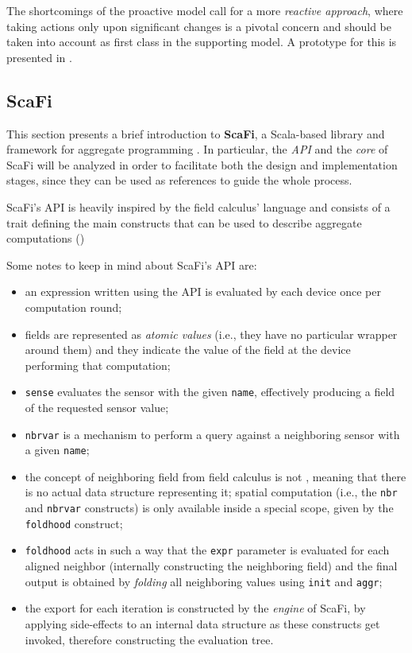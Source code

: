 The shortcomings of the proactive model call for a more \textit{reactive approach}, where taking actions only upon significant changes is a pivotal concern and should be taken into account as first class in the supporting model.
%
A prototype for this is presented in .

\subsection{ScaFi}
\label{sec:scafi}

This section presents a brief introduction to \textbf{ScaFi}, a Scala-based library and framework for aggregate programming \cite{scafi-docs}.
%
In particular, the \textit{API} and the \textit{core} of ScaFi will be analyzed in order to facilitate both the design and implementation stages, since they can be used as references to guide the whole process.

ScaFi's API is heavily inspired by the field calculus' language and consists of a trait defining the main constructs that can be used to describe aggregate computations ()
%

%
Some notes to keep in mind about ScaFi's API are:
%
\begin{itemize}
    \item an expression written using the API is evaluated by each device once per computation round;
    \item fields are represented as \textit{atomic values} (i.e., they have no particular wrapper around them) and they indicate the value of the field at the device performing that computation;
    \item \texttt{sense} evaluates the sensor with the given \texttt{name}, effectively producing a field of the requested sensor value;
    \item \texttt{nbrvar} is a mechanism to perform a query against a neighboring sensor with a given \texttt{name};
    \item the concept of neighboring field from field calculus is not , meaning that there is no actual data structure representing it; spatial computation (i.e., the \texttt{nbr} and \texttt{nbrvar} constructs) is only available inside a special scope, given by the \texttt{foldhood} construct;
    \item \texttt{foldhood} acts in such a way that the \texttt{expr} parameter is evaluated for each aligned neighbor (internally constructing the neighboring field) and the final output is obtained by \textit{folding} all neighboring values using \texttt{init} and \texttt{aggr};
    \item the export for each iteration is constructed by the \textit{engine} of ScaFi, by applying side-effects to an internal data structure as these constructs get invoked, therefore constructing the evaluation tree.
\end{itemize}


